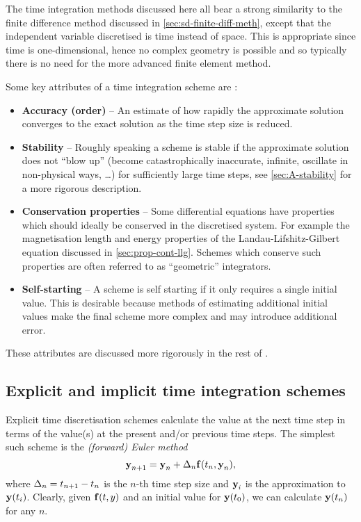 The time integration methods discussed here all bear a strong similarity to the finite difference method discussed in \cref{sec:sd-finite-diff-meth}, except that the independent variable discretised is time instead of space.
This is appropriate since time is one-dimensional, hence no complex geometry is possible and so typically there is no need for the more advanced finite element method.

Some key attributes of a time integration scheme are \cite{Atkinson2009}:
\begin{itemize}
\item \textbf{Accuracy (order)} -- An estimate of how rapidly the approximate solution converges to the exact solution as the time step size is reduced.

\item \textbf{Stability} -- Roughly speaking a scheme is stable if the approximate solution does not ``blow up'' (\ie become catastrophically inaccurate, infinite, oscillate in non-physical ways, \ldots) for sufficiently large time steps, see \cref{sec:A-stability} for a more rigorous description.

\item \textbf{Conservation properties} -- Some differential equations have properties which should ideally be conserved in the discretised system.
For example the magnetisation length and energy properties of the Landau-Lifshitz-Gilbert equation discussed in \cref{sec:prop-cont-llg}.
Schemes which conserve such properties are often referred to as ``geometric'' integrators.

\item \textbf{Self-starting} -- A scheme is self starting if it only requires a single initial value.
This is desirable because methods of estimating additional initial values make the final scheme more complex and may introduce additional error.
\end{itemize}

These attributes are discussed more rigorously in the rest of .

\subsection{Explicit and implicit time integration schemes}
\label{sec:explicit-vs-implicit-schemes}

Explicit time discretisation schemes calculate the value at the next time step in terms of the value(s) at the present and/or previous time steps.
The simplest such scheme is the \emph{(forward) Euler method}
\begin{equation}
  \label{eq:44}
  \boldsymbol{\mathrm{y}}_{n+1} = \boldsymbol{\mathrm{y}}_n + \Delta_{n} {\boldsymbol{\mathrm{f}}}(t_n, \boldsymbol{\mathrm{y}}_n),
\end{equation}
where $\Delta_{n} = t_{n+1} - t_n$ is the $n$-th time step size and $\boldsymbol{\mathrm{y}}_i$ is the approximation to $\boldsymbol{\mathrm{y}}(t_i)$.
Clearly, given ${\boldsymbol{\mathrm{f}}}(t,y)$ and an initial value for $\boldsymbol{\mathrm{y}}(t_0)$, we can calculate $\boldsymbol{\mathrm{y}}(t_n)$ for any $n$.

